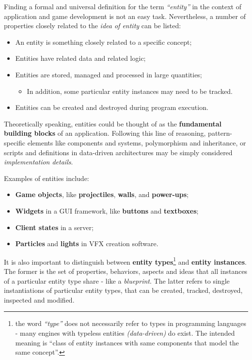 \documentclass[twoside, 12pt, a4paper, openright]{book}
\providecommand{\tightlist}{%
  \setlength{\itemsep}{0pt}\setlength{\parskip}{0pt}}
\begin{document}
Finding a formal and universal definition for the term \emph{``entity''}
in the context of application and game development is not an easy task.
Nevertheless, a number of properties closely related to the \emph{idea
of entity} can be listed:

\begin{itemize}
\item
  An entity is something closely related to a specific concept;
\item
  Entities have related data and related logic;
\item
  Entities are stored, managed and processed in large quantities;

  \begin{itemize}
  \tightlist
  \item
    In addition, some particular entity instances may need to be
    tracked.
  \end{itemize}
\item
  Entities can be created and destroyed during program execution.
\end{itemize}

Theoretically speaking, entities could be thought of as the
\textbf{fundamental building blocks} of an application. Following this
line of reasoning, pattern-specific elements like components and
systems, polymorphism and inheritance, or scripts and definitions in
data-driven architectures may be simply considered \emph{implementation
details}.

Examples of entities include:

\begin{itemize}
\item
  \textbf{Game objects}, like \textbf{projectiles}, \textbf{walls}, and
  \textbf{power-ups};
\item
  \textbf{Widgets} in a GUI framework, like \textbf{buttons} and
  \textbf{textboxes};
\item
  \textbf{Client states} in a server;
\item
  \textbf{Particles} and \textbf{lights} in VFX creation software.
\end{itemize}

It is also important to distinguish between \textbf{entity
types}\footnote{the word \emph{``type''} does not necessarily refer to
  types in programming languages - many engines with typeless entities
  \emph{(data-driven)} do exist. The intended meaning is ``class of
  entity instances with same components that model the same concept''.}
and \textbf{entity instances}. The former is the set of properties,
behaviors, aspects and ideas that all instances of a particular entity
type share - like a \emph{blueprint}. The latter refers to single
instantiations of particular entity types, that can be created, tracked,
destroyed, inspected and modified.
\end{document}
